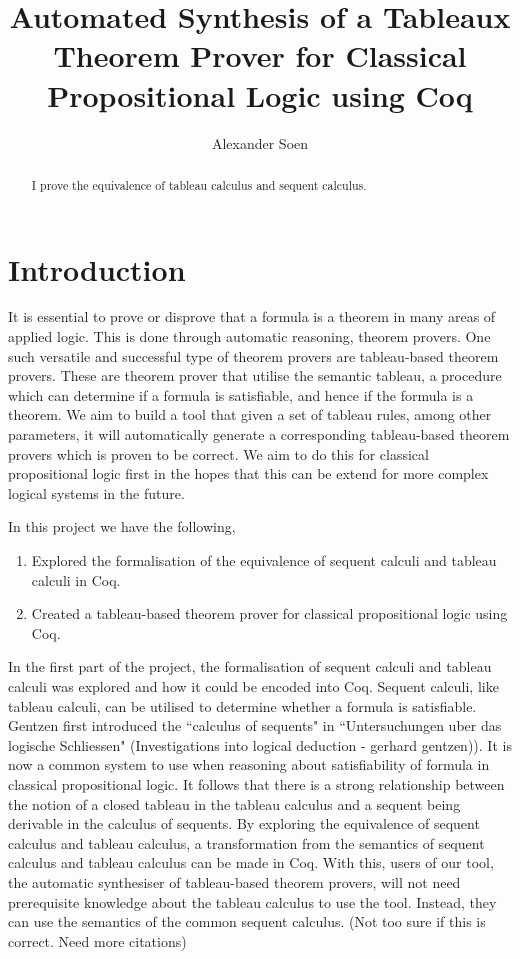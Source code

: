 \documentclass{article}
\title{Automated Synthesis of a Tableaux Theorem Prover for Classical
Propositional Logic using Coq}
\author{Alexander Soen}
\begin{document}
\begin{abstract}
I prove the equivalence of tableau calculus and sequent calculus.
\end{abstract}

\section{Introduction}

It is essential to prove or disprove that a formula is a theorem in many areas
of applied logic. This is done through automatic reasoning, theorem provers.
One such versatile and successful type of theorem provers are tableau-based
theorem provers. These are theorem prover that utilise the semantic tableau, a
procedure which can determine if a formula is satisfiable, and hence if the
formula is a theorem. We aim to build a tool that given a set of tableau rules,
among other parameters, it will automatically generate a corresponding
tableau-based theorem provers which is proven to be correct. We aim to do this
for classical propositional logic first in the hopes that this can be extend
for more complex logical systems in the future.

In this project we have the following,

\begin{enumerate}
\item Explored the formalisation of the equivalence of sequent calculi and 
tableau calculi in Coq.
\item Created a tableau-based theorem prover for classical
propositional logic using Coq.
\end{enumerate}

In the first part of the project, the formalisation of sequent calculi and
tableau calculi was explored and how it could be encoded into Coq. Sequent
calculi, like tableau calculi, can be utilised to determine whether a formula
is satisfiable. Gentzen first introduced the ``calculus of sequents" in
``Untersuchungen uber das logische Schliessen" (Investigations into logical
deduction - gerhard gentzen)). It is now a common system to use when reasoning
about satisfiability of formula in classical propositional logic. It follows
that there is a strong relationship between the notion of a closed tableau in
the tableau calculus and a sequent being derivable in the calculus of sequents.
By exploring the equivalence of sequent calculus and tableau calculus, a
transformation from the semantics of sequent calculus and tableau calculus can
be made in Coq. With this, users of our tool, the automatic synthesiser of
tableau-based theorem provers, will not need prerequisite knowledge about the
tableau calculus to use the tool. Instead, they can use the semantics of the
common sequent calculus.
(Not too sure if this is correct. Need more citations)
\end{document}
